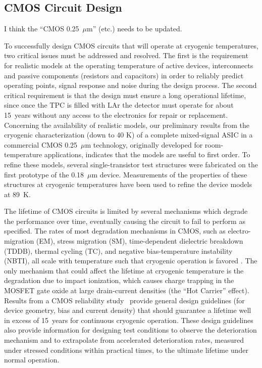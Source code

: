 \subsection{CMOS Circuit Design}

\begin{editornote}
  I think the ``CMOS 0.25~$\mu$m'' (etc.) needs to be updated.
\end{editornote}
To successfully design CMOS circuits that will operate at cryogenic 
temperatures, two critical issues must be addressed and resolved. 
The first is the requirement for realistic models at the operating temperature 
of active devices, interconnects and passive components (resistors and 
capacitors) in order to reliably predict operating points, signal response 
and noise during the design process. The second critical requirement is 
that the design must ensure a long operational lifetime, since once the TPC is filled 
with LAr the detector must operate for about 15~years without any access to the 
electronics for repair or replacement. Concerning the availability of realistic models, 
our preliminary results from the cryogenic characterization (down to 40 K) of a complete 
mixed-signal ASIC \cite{CMOS-Compton} in a commercial CMOS 0.25~$\mu$m technology, 
originally developed for room-temperature applications, indicates that the models 
are useful to first order.
To refine these models, several 
single-transistor test structures were fabricated on the first prototype of the 0.18~$\mu$m device. 
Measurements of the properties of these structures at cryogenic temperatures 
have been used to refine the device models at 89~K. 

The lifetime of CMOS circuits is limited by several mechanisms which degrade 
the performance over time, eventually causing the circuit to fail to perform as specified. 
The rates of most degradation mechanisms in CMOS, such as electro-migration (EM), 
stress migration (SM), time-dependent dielectric breakdown (TDDB), thermal cycling (TC), 
and negative bias-temperature instability (NBTI), all scale with temperature such that 
cryogenic operation is favored \cite{CMOS-lifetime}\cite{PMOS-model}. The only mechanism 
that could affect the lifetime at cryogenic temperature is the degradation due to 
impact ionization, which causes charge trapping in the MOSFET gate oxide at 
large drain-current densities (the ``Hot Carrier'' effect). Results from a CMOS reliability study~\cite{CMOS-reliability} 
provide general design guidelines (for device geometry, bias and current density) 
that should guarantee a lifetime well in excess of 15~years for continuous cryogenic operation. 
These design guidelines also provide information for designing test conditions to observe the 
deterioration mechanism and to extrapolate from accelerated deterioration rates, 
measured under stressed conditions within practical times, to the ultimate lifetime under normal operation.

